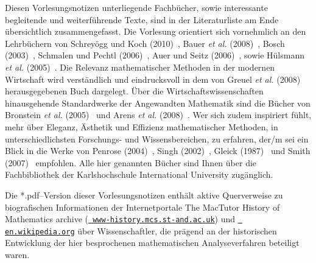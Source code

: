 \medskip
\noindent
Diesen Vorlesungsnotizen unterliegende Fachb\"ucher, sowie
interessante begleitende und weiterf\"uhrende Texte, sind in der
Literaturliste am Ende \"ubersichtlich zusammengefasst.
Die Vorlesung orientiert sich vornehmlich an den Lehrb\"uchern
von Schrey\"ogg und Koch (2010)~,
Bauer {\em et al.\/} (2008)~,
Bosch (2003)~, Schmalen und Pechtl
(2006)~, Auer und Seitz (2006)~,
sowie H\"ulsmann {\em et al.\/} (2005)~. Die
Relevanz mathematischer Methoden in der modernen Wirtschaft wird
verst\"andlich und eindrucksvoll in dem von Greuel {\em et al.\/}
(2008)~ herausgegebenen Buch dargelegt.
\"Uber die Wirtschaftswissenschaften hinausgehende Standardwerke
der Angewandten Mathematik sind die B\"ucher von
Bronstein {\em et al.\/} (2005)~ und
Arens {\em et al.\/} (2008)~. Wer sich zudem
inspiriert f\"uhlt, mehr \"uber Eleganz, \"Asthetik und Effizienz
mathematischer Methoden, in unterschiedlichsten Forschungs- und
Wissensbereichen, zu erfahren, der/m sei ein Blick in die Werke
von Penrose (2004)~, Singh (2002)~, Gleick
(1987)~ und Smith (2007)~ empfohlen. Alle
hier genannten B\"ucher sind Ihnen \"uber die Fachbibliothek der
Karlshochschule International University zug\"anglich.

\medskip
\noindent
Die *.pdf--Version dieser Vorlesungsnotizen enth\"alt aktive 
Querverweise zu biografischen Informationen der Internetportale 
The MacTutor History of Mathematics archive 
(\href{http://www-history.mcs.st-and.ac.uk}{{\tt 
www-history.mcs.st-and.ac.uk}}) und 
\href{http://en.wikipedia.org/wiki/Main_Page}{{\tt 
en.wikipedia.org}} \"uber Wissenschaftler, die pr\"agend an der 
historischen Entwicklung der hier besprochenen mathematischen 
Analyseverfahren beteiligt waren.

